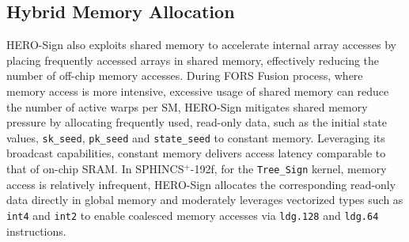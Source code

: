 \documentclass[10pt,conference]{IEEEtran}
\begin{document}
\subsection{Hybrid Memory Allocation}
\label{sec:HybridME}
HERO-Sign also exploits shared memory to accelerate internal array accesses by placing frequently accessed arrays in shared memory, effectively reducing the number of off-chip memory accesses. During FORS Fusion process, where memory access is more intensive, excessive usage of shared memory can reduce the number of active warps per SM, HERO-Sign mitigates shared memory pressure by allocating frequently used, read-only data, such as the initial state values, \texttt{sk\_seed}, \texttt{pk\_seed} and \texttt{state\_seed} to constant memory. Leveraging its broadcast capabilities, constant memory delivers access latency comparable to that of on-chip SRAM. In SPHINCS$^+$-192f, for the \texttt{Tree\_Sign} kernel, memory access is relatively infrequent, HERO-Sign allocates the corresponding read-only data directly in global memory and moderately leverages vectorized types such as \texttt{int4} and \texttt{int2} to enable coalesced memory accesses via \texttt{ldg.128} and \texttt{ldg.64} instructions.





\end{document}
